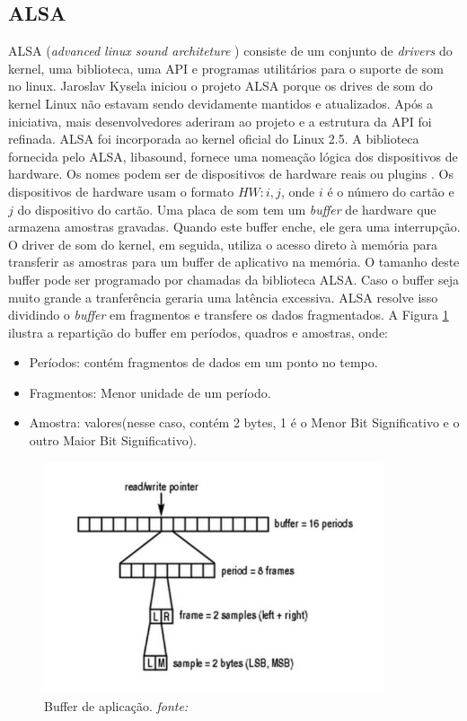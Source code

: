 \subsection{ALSA}
\quad ALSA (\textit{advanced linux sound architeture }) consiste de um conjunto de \textit{drivers} do kernel, uma biblioteca, uma API e programas utilitários para o suporte de som no linux. Jaroslav Kysela iniciou o projeto ALSA porque os drives de som do kernel Linux não estavam sendo devidamente mantidos e atualizados. Após  a iniciativa, mais desenvolvedores aderiram ao projeto e a estrutura da API foi refinada. ALSA foi incorporada ao kernel oficial do Linux 2.5.
A biblioteca fornecida pelo ALSA, libasound, fornece uma nomeação lógica dos dispositivos de hardware. Os nomes podem ser de dispositivos de hardware reais ou plugins \cite{linux}. Os dispositivos de hardware usam o formato $HW:i,j$, onde $i$ é o número do cartão e $j$ do dispositivo do cartão. Uma placa de som tem um \textit{buffer} de hardware que armazena amostras gravadas. Quando este buffer enche, ele gera uma interrupção. O driver de som do kernel, em seguida, utiliza o acesso direto à memória  para transferir as amostras para um buffer de aplicativo na memória. O tamanho deste buffer pode ser  programado por chamadas da biblioteca ALSA. Caso o buffer seja muito grande a tranferência geraria uma latência excessiva. ALSA resolve isso dividindo o \textit{buffer} em fragmentos e transfere os dados fragmentados. A Figura \ref{fig:pcm} ilustra a repartição do buffer em períodos, quadros e amostras, onde: 
\begin{itemize}
\item Períodos: contém fragmentos de dados em um ponto no tempo.
\item Fragmentos: Menor unidade de um período.
\item Amostra: valores(nesse caso,  contém 2 bytes, 1 é o Menor Bit Significativo e o outro Maior Bit Significativo).
\end{itemize}
\begin{figure}[H]
\centering %
\includegraphics[width=10cm]{img/pcm.jpg} %
\caption{Buffer de aplicação. \textit{fonte:\cite{linux}}}
\label{fig:pcm}
\end{figure}

